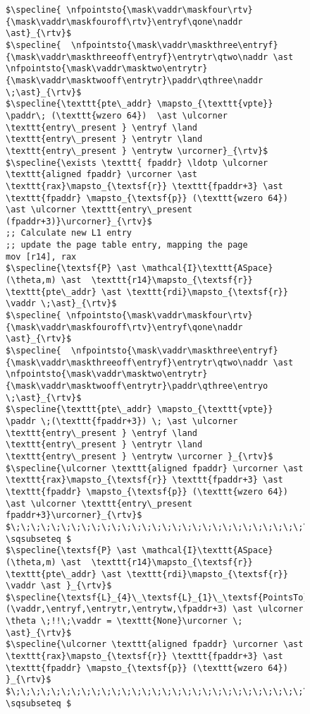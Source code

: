 \begin{figure}
\begin{lstlisting}[mathescape]
$\specline{ \nfpointsto{\mask\vaddr\maskfour\rtv}{\mask\vaddr\maskfouroff\rtv}\entryf\qone\naddr \ast}_{\rtv}$ 
$\specline{  \nfpointsto{\mask\vaddr\maskthree\entryf}{\mask\vaddr\maskthreeoff\entryf}\entrytr\qtwo\naddr \ast \nfpointsto{\mask\vaddr\masktwo\entrytr}{\mask\vaddr\masktwooff\entrytr}\paddr\qthree\naddr \;\ast}_{\rtv}$
$\specline{\texttt{pte\_addr} \mapsto_{\texttt{vpte}} \paddr\; (\texttt{wzero 64})  \ast \ulcorner \texttt{entry\_present } \entryf \land \texttt{entry\_present } \entrytr \land  \texttt{entry\_present } \entrytw \urcorner}_{\rtv}$
$\specline{\exists \texttt{ fpaddr} \ldotp \ulcorner \texttt{aligned fpaddr} \urcorner \ast \texttt{rax}\mapsto_{\textsf{r}} \texttt{fpaddr+3} \ast \texttt{fpaddr} \mapsto_{\textsf{p}} (\texttt{wzero 64}) \ast \ulcorner \texttt{entry\_present (fpaddr+3)}\urcorner}_{\rtv}$
;; Calculate new L1 entry
;; update the page table entry, mapping the page
mov [r14], rax
$\specline{\textsf{P} \ast \mathcal{I}\texttt{ASpace}(\theta,m) \ast  \texttt{r14}\mapsto_{\textsf{r}} \texttt{pte\_addr} \ast \texttt{rdi}\mapsto_{\textsf{r}} \vaddr \;\ast}_{\rtv}$
$\specline{ \nfpointsto{\mask\vaddr\maskfour\rtv}{\mask\vaddr\maskfouroff\rtv}\entryf\qone\naddr \ast}_{\rtv}$ 
$\specline{  \nfpointsto{\mask\vaddr\maskthree\entryf}{\mask\vaddr\maskthreeoff\entryf}\entrytr\qtwo\naddr \ast \nfpointsto{\mask\vaddr\masktwo\entrytr}{\mask\vaddr\masktwooff\entrytr}\paddr\qthree\entryo \;\ast}_{\rtv}$
$\specline{\texttt{pte\_addr} \mapsto_{\texttt{vpte}} \paddr \;(\texttt{fpaddr+3}) \; \ast \ulcorner \texttt{entry\_present } \entryf \land \texttt{entry\_present } \entrytr \land  \texttt{entry\_present } \entrytw \urcorner }_{\rtv}$
$\specline{\ulcorner \texttt{aligned fpaddr} \urcorner \ast \texttt{rax}\mapsto_{\textsf{r}} \texttt{fpaddr+3} \ast \texttt{fpaddr} \mapsto_{\textsf{p}} (\texttt{wzero 64}) \ast \ulcorner \texttt{entry\_present fpaddr+3}\urcorner}_{\rtv}$
$\;\;\;\;\;\;\;\;\;\;\;\;\;\;\;\;\;\;\;\;\;\;\;\;\;\;\;\;\;\;\;\;\;\;\;\;\;\;\;\;\;\;\;\; \sqsubseteq $
$\specline{\textsf{P} \ast \mathcal{I}\texttt{ASpace}(\theta,m) \ast  \texttt{r14}\mapsto_{\textsf{r}} \texttt{pte\_addr} \ast \texttt{rdi}\mapsto_{\textsf{r}} \vaddr \ast }_{\rtv}$
$\specline{\textsf{L}_{4}\_\textsf{L}_{1}\_\textsf{PointsTo}(\vaddr,\entryf,\entrytr,\entrytw,\fpaddr+3) \ast \ulcorner \theta \;!!\;\vaddr = \texttt{None}\urcorner \; \ast}_{\rtv}$
$\specline{\ulcorner \texttt{aligned fpaddr} \urcorner \ast \texttt{rax}\mapsto_{\textsf{r}} \texttt{fpaddr+3} \ast \texttt{fpaddr} \mapsto_{\textsf{p}} (\texttt{wzero 64}) }_{\rtv}$
$\;\;\;\;\;\;\;\;\;\;\;\;\;\;\;\;\;\;\;\;\;\;\;\;\;\;\;\;\;\;\;\;\;\;\;\;\;\;\;\;\;\;\;\; \sqsubseteq $

\end{lstlisting}
\end{figure}

